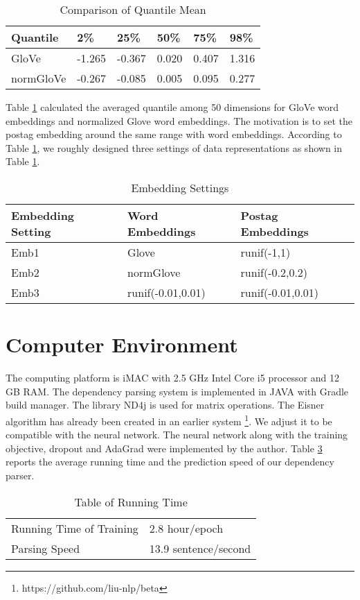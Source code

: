\begin{table}
\centering
    \begin{tabular}{@{}l l l l l l@{}} \toprule
    Quantile &2\%&25\%&50\%&75\%&98\% \\ \midrule 
    GloVe&-1.265&-0.367&0.020&0.407&1.316 \\  
    normGloVe&-0.267&-0.085&0.005&0.095&0.277 \\  
    \bottomrule
    \end{tabular}  
\caption{Comparison of Quantile Mean}\label{tab:quantile}
\end{table}
Table \ref{tab:quantile} calculated the averaged quantile among 50 dimensions for GloVe word embeddings and normalized Glove word embeddings. The motivation is to set the postag embedding around the same range with word embeddings. According to Table \ref{tab:quantile}, we roughly designed three settings of data representations as shown in Table \ref{tab:quantile}.
\begin{table}
\centering
    \begin{tabular}{@{}l l l@{}} \toprule
    Embedding Setting&Word Embeddings & Postag Embeddings \\  \midrule
    Emb1&Glove& runif(-1,1)\\
    Emb2&normGlove& runif(-0.2,0.2)\\
    Emb3&runif(-0.01,0.01)&runif(-0.01,0.01)\\
    \bottomrule
    \end{tabular}
\caption{Embedding Settings}\label{tab:datarp}
\end{table}

\section{Computer Environment}
\label{sec:Experiments Environment}
The computing platform is iMAC with 2.5 GHz Intel Core i5 processor and 12 GB RAM. The dependency parsing system is implemented in JAVA with Gradle build manager.  The library ND4j is used for matrix operations. The Eisner algorithm has already been created in an earlier system \footnote[4]{https://github.com/liu-nlp/beta}. We adjust it to be compatible with the neural network. The neural network along with the training objective, dropout and AdaGrad were implemented by the author. Table \ref{tab:runtime} reports the average running time and the prediction speed of our dependency parser.
\begin{table}
\centering
    \begin{tabular}{@{}l l @{}} \toprule
    Running Time of Training & 2.8 hour/epoch\\ 
    Parsing Speed& 13.9 sentence/second\\
    \bottomrule
    \end{tabular}
\caption{Table of Running Time}\label{tab:runtime}
\end{table}

